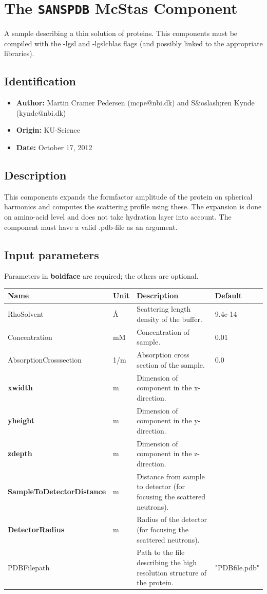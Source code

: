 \section{The \texttt{SANSPDB} McStas Component}
A sample describing a thin solution of proteins. This components must be compiled
with the -lgsl and -lgslcblas flags (and possibly linked to the appropriate
libraries).

\subsection*{Identification}
\begin{itemize}
  \item \textbf{Author:} Martin Cramer Pedersen (mcpe@nbi.dk) and S\&oslash;ren Kynde (kynde@nbi.dk)
  \item \textbf{Origin:} KU-Science
  \item \textbf{Date:} October 17, 2012
\end{itemize}

\subsection*{Description}
This components expands the formfactor amplitude of the protein on spherical harmonics and computes the scattering profile using these. The expansion is done on amino-acid level and does not take hydration layer into account. The component must have a valid .pdb-file as an argument.

\subsection*{Input parameters}
Parameters in \textbf{boldface} are required; the others are optional.

\begin{longtable}{p{}p{}p{}p{}}
\toprule
\textbf{Name} & \textbf{Unit} & \textbf{Description} & \textbf{Default} \\
\midrule
\endhead
RhoSolvent & \AA{} & Scattering length density of the buffer. & 9.4e-14 \\
Concentration & mM & Concentration of sample. & 0.01 \\
AbsorptionCrosssection & 1/m & Absorption cross section of the sample. & 0.0 \\
\textbf{xwidth} & m & Dimension of component in the x-direction. &  \\
\textbf{yheight} & m & Dimension of component in the y-direction. &  \\
\textbf{zdepth} & m & Dimension of component in the z-direction. &  \\
\textbf{SampleToDetectorDistance} & m & Distance from sample to detector (for focusing the scattered neutrons). &  \\
\textbf{DetectorRadius} & m & Radius of the detector (for focusing the scattered neutrons). &  \\
PDBFilepath &  & Path to the file describing the high resolution structure of the protein. & "PDBfile.pdb" \\
\bottomrule
\end{longtable}

